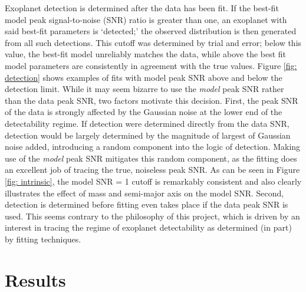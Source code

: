 \documentclass[12pt,manuscript]{aastex}
\begin{document}
Exoplanet detection is determined after the data has been fit. 
If the best-fit model peak signal-to-noise (SNR) ratio is greater than one, an exoplanet with said best-fit parameters is `detected;' the observed distribution is then generated from all such detections.
This cutoff was determined by trial and error; below this value, the best-fit model unreliably matches the data, while above the best fit model parameters are consistently in agreement with the true values.
Figure \ref{fig: detection} shows examples of fits with model peak SNR above and below the detection limit.
While it may seem bizarre to use the \textit{model} peak SNR rather than the data peak SNR, two factors motivate this decision.
First, the peak SNR of the data is strongly affected by the Gaussian noise at the lower end of the detectability regime.
If detection were determined directly from the data SNR, detection would be largely determined by the magnitude of largest of Gaussian noise added, introducing a random component into the logic of detection.
Making use of the \textit{model} peak SNR mitigates this random component, as the fitting does an excellent job of tracing the true, noiseless peak SNR.
As can be seen in Figure \ref{fig: intrinsic}, the model SNR = 1 cutoff is remarkably consistent and also clearly illustrates the effect of mass and semi-major axis on the model SNR.
Second, detection is determined before fitting even takes place if the data peak SNR is used.
This seems contrary to the philosophy of this project, which is driven by an interest in tracing the regime of exoplanet detectability as determined (in part) by fitting techniques.


\section{Results}
\label{section: results}
\end{document}
